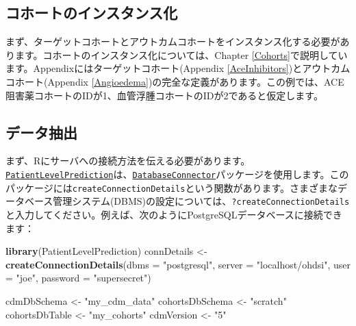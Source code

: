 \documentclass[
  11pt]{book}
\newenvironment{Shaded}{\begin{snugshade}}{\end{snugshade}}
\newcommand{\AttributeTok}[1]{\textcolor[rgb]{0.13,0.29,0.53}{#1}}
\newcommand{\FunctionTok}[1]{\textcolor[rgb]{0.13,0.29,0.53}{\textbf{#1}}}
\newcommand{\NormalTok}[1]{#1}
\newcommand{\OtherTok}[1]{\textcolor[rgb]{0.56,0.35,0.01}{#1}}
\newcommand{\StringTok}[1]{\textcolor[rgb]{0.31,0.60,0.02}{#1}}
\theoremstyle{definition}
\theoremstyle{definition}
\theoremstyle{definition}
\theoremstyle{definition}
\theoremstyle{remark}
\begin{document}
\subsection{コホートのインスタンス化}\label{ux30b3ux30dbux30fcux30c8ux306eux30a4ux30f3ux30b9ux30bfux30f3ux30b9ux5316-2}

まず、ターゲットコホートとアウトカムコホートをインスタンス化する必要があります。コホートのインスタンス化については、Chapter \ref{Cohorts}で説明しています。Appendixにはターゲットコホート(Appendix \ref{AceInhibitors})とアウトカムコホート(Appendix \ref{Angioedema})の完全な定義があります。この例では、ACE阻害薬コホートのIDが1、血管浮腫コホートのIDが2であると仮定します。

\subsection{データ抽出}\label{ux30c7ux30fcux30bfux62bdux51fa-3}

まず、Rにサーバへの接続方法を伝える必要があります。\href{https://ohdsi.github.io/PatientLevelPrediction/}{\texttt{PatientLevelPrediction}}は、\href{https://ohdsi.github.io/DatabaseConnector/}{\texttt{DatabaseConnector}}パッケージを使用します。このパッケージには\texttt{createConnectionDetails}という関数があります。さまざまなデータベース管理システム(DBMS)の設定については、\texttt{?createConnectionDetails}と入力してください。例えば、次のようにPostgreSQLデータベースに接続できます：

\begin{Shaded}
\begin{Highlighting}[]
\FunctionTok{library}\NormalTok{(PatientLevelPrediction)}
\NormalTok{connDetails }\OtherTok{\textless{}{-}} \FunctionTok{createConnectionDetails}\NormalTok{(}\AttributeTok{dbms =} \StringTok{"postgresql"}\NormalTok{,}
                                       \AttributeTok{server =} \StringTok{"localhost/ohdsi"}\NormalTok{,}
                                       \AttributeTok{user =} \StringTok{"joe"}\NormalTok{,}
                                       \AttributeTok{password =} \StringTok{"supersecret"}\NormalTok{)}

\NormalTok{cdmDbSchema }\OtherTok{\textless{}{-}} \StringTok{"my\_cdm\_data"}
\NormalTok{cohortsDbSchema }\OtherTok{\textless{}{-}} \StringTok{"scratch"}
\NormalTok{cohortsDbTable }\OtherTok{\textless{}{-}} \StringTok{"my\_cohorts"}
\NormalTok{cdmVersion }\OtherTok{\textless{}{-}} \StringTok{"5"}
\end{Highlighting}
\end{Shaded}
\end{document}
